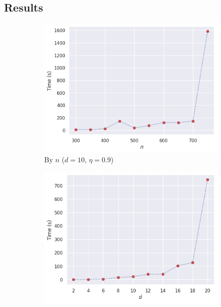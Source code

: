 \documentclass[11pt,twoside]{report}
\theoremstyle{definition}
\numberwithin{theorem}{section}
\numberwithin{definition}{section}
\numberwithin{lemma}{section}
\numberwithin{proposition}{section}
\numberwithin{equation}{section}
\numberwithin{figure}{section}
\begin{document}
\subsection{Results}
\begin{figure}[ht]
    \centering
    \begin{subfigure}[b]{0.475\textwidth}
        \centering
        \includegraphics[width=\textwidth]{exact_benchmarks/func_n_d10_eta0p9_normal.png}
        \caption{By $n$ ($d=10$, $\eta=0.9$)}
        \label{fig:exact_benchmarks_n}
    \end{subfigure}
    \hfill
    \begin{subfigure}[b]{0.475\textwidth}
        \centering
        \includegraphics[width=\textwidth]{exact_benchmarks/func_d_n300_eta0p9_normal.png}

\end{subfigure}
\end{figure}
\end{document}
